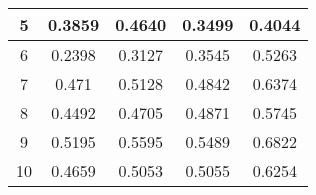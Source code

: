 \begin{table}[ht!]
\begin{tabular}{|c|c|c|c|c|}
5                                                                  & 0.3859                                 & 0.4640                                  & 0.3499                                                         & 0.4044                                 \\ \hline
6                                                                  & 0.2398                                 & 0.3127                                  & 0.3545                                                         & 0.5263                                 \\ \hline
7                                                                  & 0.471                                  & 0.5128                                  & 0.4842                                                         & 0.6374                                 \\ \hline
8                                                                  & 0.4492                                 & 0.4705                                  & 0.4871                                                         & 0.5745                                 \\ \hline
9                                                                  & 0.5195                                 & 0.5595                                  & 0.5489                                                         & 0.6822                                 \\ \hline
10                                                                 & 0.4659                                 & 0.5053                                  & 0.5055                                                         & 0.6254                                 \\ \hline
\end{tabular}
\end{table}

